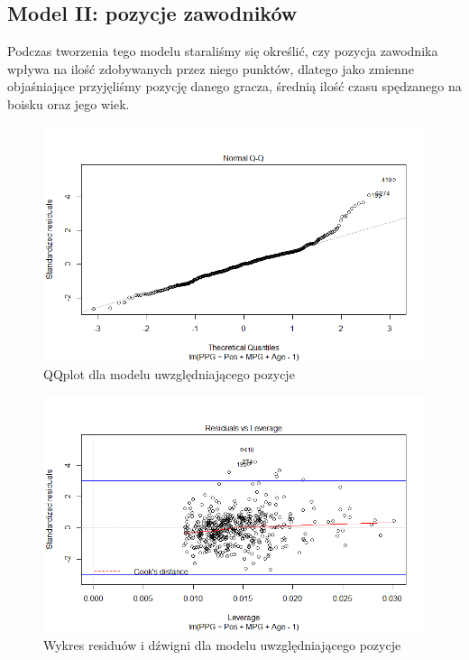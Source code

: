 \documentclass[11pt,a4paper]{article}
\begin{document}
\subsection{Model II: pozycje zawodników}
Podczas tworzenia tego modelu staraliśmy się określić, czy pozycja zawodnika wpływa na ilość zdobywanych przez niego punktów, dlatego jako zmienne objaśniające przyjęliśmy pozycję danego gracza, średnią ilość czasu spędzanego na boisku oraz jego wiek.

\begin{figure}[t]
	\includegraphics[width=\textwidth]{position_2}
	\caption{QQplot dla modelu uwzględniającego pozycje}
	\label{qqplot_position}
	\centering
\end{figure}
\begin{figure}[t]
	\includegraphics[width=\textwidth]{position_4}
	\caption{Wykres residuów i dźwigni dla modelu uwzględniającego pozycje}
	\label{leverage_position}
	\centering
\end{figure}
\end{document}
